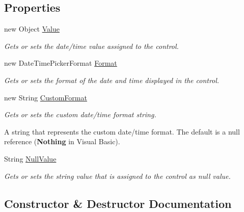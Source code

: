 \subsection*{Properties}
\begin{DoxyCompactItemize}
\item 
new Object \mbox{\hyperlink{class_custom_controls_1_1_nullable_date_time_picker_a10ca9af18d1ba8e6985257fcf374748b}{Value}}
\begin{DoxyCompactList}\small\item\em Gets or sets the date/time value assigned to the control. \end{DoxyCompactList}\item 
new Date\+Time\+Picker\+Format \mbox{\hyperlink{class_custom_controls_1_1_nullable_date_time_picker_a7e3ba070bcfbb12d9b954679652e9093}{Format}}
\begin{DoxyCompactList}\small\item\em Gets or sets the format of the date and time displayed in the control. \end{DoxyCompactList}\item 
new String \mbox{\hyperlink{class_custom_controls_1_1_nullable_date_time_picker_a1be4007c2054e1d58ee0c211aa2d4d12}{Custom\+Format}}
\begin{DoxyCompactList}\small\item\em Gets or sets the custom date/time format string. 

A string that represents the custom date/time format. The default is a null reference ({\bfseries Nothing} in Visual Basic).\end{DoxyCompactList}\item 
String \mbox{\hyperlink{class_custom_controls_1_1_nullable_date_time_picker_a9efcb8f7340f813306a8e2ca388e156e}{Null\+Value}}
\begin{DoxyCompactList}\small\item\em Gets or sets the string value that is assigned to the control as null value. \end{DoxyCompactList}\end{DoxyCompactItemize}


\subsection{Constructor \& Destructor Documentation}
\mbox{\label{class_custom_controls_1_1_nullable_date_time_picker_ae34b0db983f9509c0442e730a8baa417}} 
